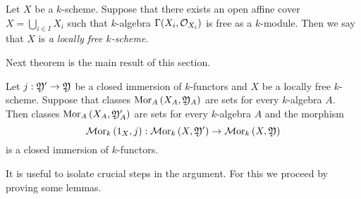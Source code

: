 \begin{definition}
Let $X$ be a $k$-scheme. Suppose that there exists an open affine cover $X = \bigcup_{i\in I}X_i$ such that $k$-algebra $\Gamma(X_i,{\mathcal O}_{X_i})$ is free as a $k$-module. Then we say that $X$ is \textit{a locally free $k$-scheme}.
\end{definition}
\noindent
Next theorem is the main result of this section.

\begin{theorem}\label{theorem:closedimmersionsandinternalhom}
Let $j:{\mathfrak Y}'\rightarrow {\mathfrak Y}$ be a closed immersion of $k$-functors and $X$ be a locally free $k$-scheme. Suppose that classes $\mathrm{Mor}_A\left(X_A,{\mathfrak Y}_A\right)$ are sets for every $k$-algebra $A$. Then classes $\mathrm{Mor}_A\left(X_A,{\mathfrak Y}'_A\right)$ are sets for every $k$-algebra $A$ and the morphism
$$\mathcal{M}\mathrm{or}_k\left(1_X,j\right):\mathcal{M}\mathrm{or}_k\left(X,{\mathfrak Y}'\right)\rightarrow \mathcal{M}\mathrm{or}_k\left(X,{\mathfrak Y}\right)$$
is a closed immersion of $k$-functors.
\end{theorem}
\noindent
It is useful to isolate crucial steps in the argument. For this we proceed by proving some lemmas.

